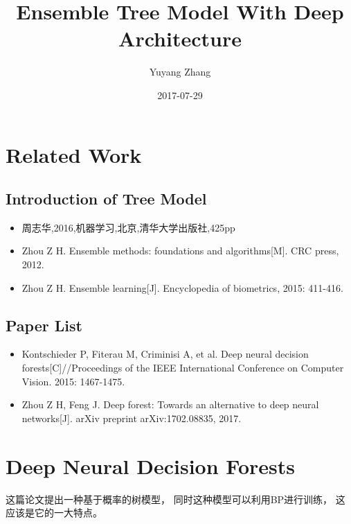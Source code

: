 \documentclass[UTF8]{ctexart}
\title{Ensemble Tree Model With Deep Architecture}
\author{Yuyang Zhang}
\date{2017-07-29} %
\begin{document}
\maketitle
%
%
\section{Related Work}
\subsection{Introduction of Tree Model}
\begin{itemize}
\item 周志华,2016,机器学习,北京,清华大学出版社,425pp
\item Zhou Z H. Ensemble methods: foundations and algorithms[M]. CRC press, 2012.
\item Zhou Z H. Ensemble learning[J]. Encyclopedia of biometrics, 2015: 411-416.
\end{itemize}

\subsection{Paper List}
\begin{itemize}
\item Kontschieder P, Fiterau M, Criminisi A, et al. Deep neural decision forests[C]//Proceedings of the IEEE International Conference on Computer Vision. 2015: 1467-1475.
\item Zhou Z H, Feng J. Deep forest: Towards an alternative to deep neural networks[J]. arXiv preprint arXiv:1702.08835, 2017.
\end{itemize}

%
%
\section{Deep Neural Decision Forests}
这篇论文提出一种基于概率的树模型，
同时这种模型可以利用BP进行训练，
这应该是它的一大特点。
\end{document}
